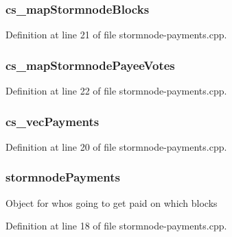 \subsubsection[{cs\+\_\+map\+Stormnode\+Blocks}]{ cs\+\_\+map\+Stormnode\+Blocks}\label{stormnode-payments_8h_ab9dc21266fc508439f6ed0422da8b214}


Definition at line 21 of file stormnode-\/payments.\+cpp.

\hypertarget{stormnode-payments_8h_a339b2de1a0d1e6bb993ac7abe7f742d2}{}
\subsubsection[{cs\+\_\+map\+Stormnode\+Payee\+Votes}]{ cs\+\_\+map\+Stormnode\+Payee\+Votes}\label{stormnode-payments_8h_a339b2de1a0d1e6bb993ac7abe7f742d2}


Definition at line 22 of file stormnode-\/payments.\+cpp.

\hypertarget{stormnode-payments_8h_ad7b9616c84ed22224772799b69d7cbeb}{}
\subsubsection[{cs\+\_\+vec\+Payments}]{ cs\+\_\+vec\+Payments}\label{stormnode-payments_8h_ad7b9616c84ed22224772799b69d7cbeb}


Definition at line 20 of file stormnode-\/payments.\+cpp.

\hypertarget{stormnode-payments_8h_a1d528b1b067a2f669dfd90c513a97116}{}
\subsubsection[{stormnode\+Payments}]{ stormnode\+Payments}\label{stormnode-payments_8h_a1d528b1b067a2f669dfd90c513a97116}
Object for who\textquotesingle{}s going to get paid on which blocks 

Definition at line 18 of file stormnode-\/payments.\+cpp.

